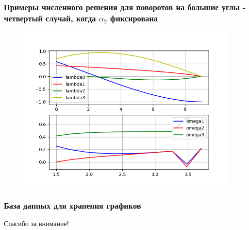 \documentclass[10pt,utf8,presentation,notheorems,xcolor=dvipsnames,compress]{beamer}
\begin{document}
\begin{frame}
\frametitle{Примеры численного решения для поворотов на большие углы - четвертый случай, когда $\alpha_2$ фиксирована}
\begin{figure}[H]\label{one}
\center\includegraphics[scale=0.5]{fig/ivp_and_control_1_5-3_7_50.png}
\caption{}
\end{figure}
\end{frame}

\begin{frame}
\frametitle{База данных для хранения графиков}
\end{frame}

\begin{frame}
\begin{center}
\begin{Huge}
Спасибо за внимание!
\end{Huge}
\end{center}
\end{frame}
\end{document}
